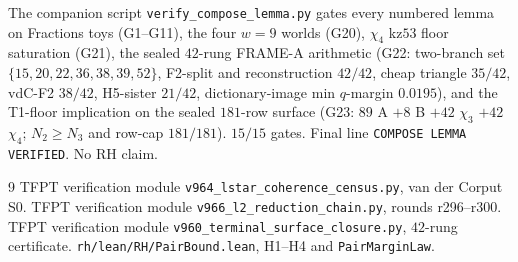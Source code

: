 \documentclass[11pt]{article}
\theoremstyle{remark}
\begin{document}
The companion script \texttt{verify\_compose\_lemma.py} gates
every numbered lemma on Fractions toys (G1--G11), the four
$w=9$ worlds (G20), $\chi_4$ kz$53$ floor saturation (G21),
the sealed $42$-rung FRAME-A arithmetic (G22: two-branch set
$\{15,20,22,36,38,39,52\}$, F2-split and reconstruction
$42/42$, cheap triangle $35/42$, vdC-F2 $38/42$, H5-sister
$21/42$, dictionary-image min $q$-margin $0.0195$), and the
T1-floor implication on the sealed $181$-row surface (G23:
$89$ A $+8$ B $+42$ $\chi_3$ $+42$ $\chi_4$; $N_2\ge N_3$
and row-cap $181/181$).  $15/15$ gates.  Final line
\texttt{COMPOSE LEMMA VERIFIED}.  No RH claim.

\begin{thebibliography}{9}
 TFPT verification module
  \texttt{v964\_lstar\_coherence\_census.py}, van der Corput S0.
 TFPT verification module
  \texttt{v966\_l2\_reduction\_chain.py}, rounds r296--r300.
 TFPT verification module
  \texttt{v960\_terminal\_surface\_closure.py}, $42$-rung
  certificate.
 \texttt{rh/lean/RH/PairBound.lean}, H1--H4 and
  \texttt{PairMarginLaw}.
\end{thebibliography}
\end{document}
